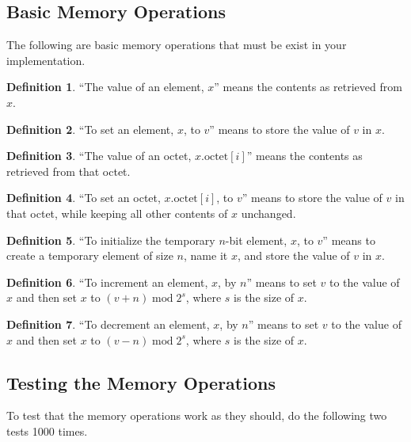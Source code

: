 \documentclass[a4paper,12pt]{article}
\newcommand{\octno}[2]{#1.\mathrm{octet}[#2]}
\DeclareMathOperator{\MOD}{mod}
\newcommand{\modulo}[2]{#1 \MOD #2}
\theoremstyle{definition}
\newtheorem{definition}{Definition}
\begin{document}
\subsection{Basic Memory Operations}
\label{sec:memory-operations}

The following are basic memory operations that must be exist in your implementation.

\begin{definition}
``The value of an element, $x$'' means the contents as retrieved from $x$.
\end{definition}

\begin{definition}
``To set an element, $x$, to $v$'' means to store the value of $v$ in $x$.
\end{definition}

\begin{definition}
``The value of an octet, $\octno{x}{i}$'' means the contents as retrieved from that octet.
\end{definition}

\begin{definition}
``To set an octet, $\octno{x}{i}$, to $v$'' means to store the value of $v$ in that octet, while keeping all other contents of $x$ unchanged.
\end{definition}

\begin{definition}
``To initialize the temporary $n$-bit element, $x$, to $v$'' means to create a temporary element of size $n$, name it $x$, and store the value of $v$ in $x$.
\end{definition}

\begin{definition}
``To increment an element, $x$, by $n$'' means to set $v$ to the value of $x$ and then set $x$ to $\modulo{(v + n)}{2^s}$, where $s$ is the size of $x$.
\end{definition}

\begin{definition}
``To decrement an element, $x$, by $n$'' means to set $v$ to the value of $x$ and then set $x$ to $\modulo{(v - n)}{2^s}$, where $s$ is the size of $x$.
\end{definition}

\subsection{Testing the Memory Operations}

To test that the memory operations work as they should, do the following two tests 1000 times.
\end{document}
